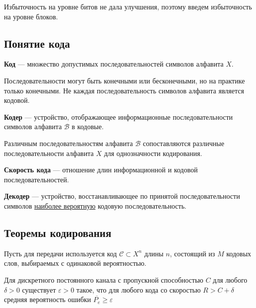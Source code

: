 Избыточность на уровне битов не дала улучшения, поэтому введем избыточность на уровне блоков.

\subsection{Понятие кода}

\begin{definition}
    \textbf{Код} --- множество допустимых последовательностей символов алфавита \(X\).
\end{definition}

Последовательности могут быть конечными или бесконечными, но на практике только конечными. Не каждая последовательность символов алфавита является кодовой.

\begin{definition}
    \textbf{Кодер} --- устройство, отображающее информационные последовательности символов алфавита \(\mathcal B\) в кодовые.
\end{definition}

Различным последовательностям алфавита \(\mathcal B\) сопоставляются различные последовательности алфавита \(X\) для однозначности кодирования.

\begin{definition}
    \textbf{Скорость кода} --- отношение длин информационной и кодовой последовательностей.
\end{definition}

\begin{definition}
    \textbf{Декодер} --- устройство, восстанавливающее по принятой последовательности символов \underline{наиболее вероятную} кодовую последовательность.
\end{definition}

\subsection{Теоремы кодирования}

Пусть для передачи используется код \(\mathcal C \subset X^n\) длины \(n\), состоящий из \(M\) кодовых слов, выбираемых с одинаковой вероятностью.

\begin{theorem}[обратная]
    Для дискретного постоянного канала с пропускной способностью \(C\) для любого \(\delta > 0\) существует \(\varepsilon > 0\) такое, что для любого кода со скоростью \(R > C + \delta\) средняя вероятность ошибки \(\overline{P_e} \ge \varepsilon\)
\end{theorem}

